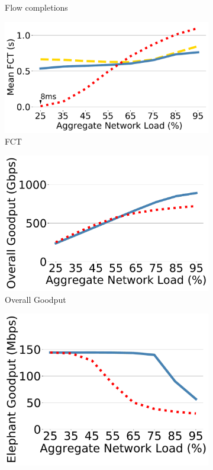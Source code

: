 \begin{figure}[t]
\begin{subfigure}[t]{.32\linewidth}
		\caption{\small{Flow completions}}
		\label{fig:motiv6}
	\end{subfigure}
		\begin{subfigure}[t]{.32\linewidth}
	\centering
	\includegraphics[width=0.98\linewidth]{figs/cc5.pdf}
		\caption{\small{FCT}}
		\label{fig:motiv7}
	\end{subfigure}
		\begin{subfigure}[t]{.32\linewidth}
	\centering
	\includegraphics[width=0.98\linewidth]{figs/cc3.pdf}
		\caption{\small{Overall Goodput}}
		\label{fig:motiv5}
	\end{subfigure}
		\begin{subfigure}[t]{.32\linewidth}
	\centering
	\includegraphics[width=0.98\linewidth]{figs/cc6.pdf}

\end{subfigure}
\end{figure}

